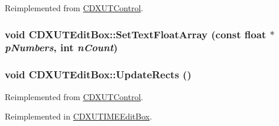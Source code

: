 Reimplemented from \hyperlink{class_c_d_x_u_t_control_a9132bb5d6b1d2bff1f20df33fec8c98b}{CDXUTControl}.\hypertarget{class_c_d_x_u_t_edit_box_a97571e11cb7c2a19e3cf35239a8ff44e}{
\subsubsection[{SetTextFloatArray}]{\setlength{\rightskip}{0pt plus 5cm}void CDXUTEditBox::SetTextFloatArray (const float $\ast$ {\em pNumbers}, \/  {\bf int} {\em nCount})}}
\label{class_c_d_x_u_t_edit_box_a97571e11cb7c2a19e3cf35239a8ff44e}
\hypertarget{class_c_d_x_u_t_edit_box_a86b6a5f6a509b4bc15f2edd8926718d5}{
\subsubsection[{UpdateRects}]{\setlength{\rightskip}{0pt plus 5cm}void CDXUTEditBox::UpdateRects ()}}
\label{class_c_d_x_u_t_edit_box_a86b6a5f6a509b4bc15f2edd8926718d5}


Reimplemented from \hyperlink{class_c_d_x_u_t_control_a5fb3a79178c678abaa0da57566a09002}{CDXUTControl}.

Reimplemented in \hyperlink{class_c_d_x_u_t_i_m_e_edit_box_a5b000e31365cfc36ea9c01cce29d1656}{CDXUTIMEEditBox}.


